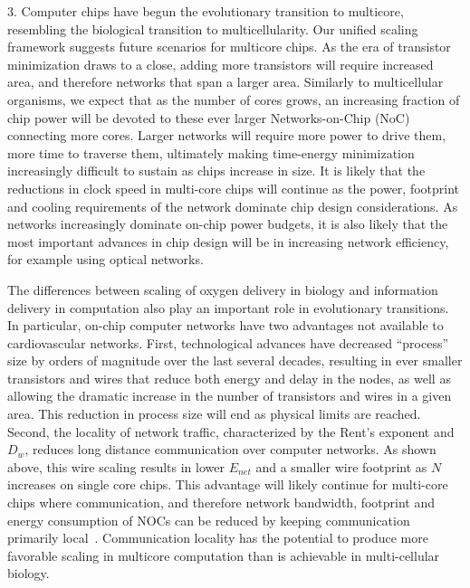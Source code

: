 \documentclass[12pt]{article}
\begin{document}
3. Computer chips have begun the evolutionary transition to multicore, resembling the
biological transition to multicellularity. Our unified scaling framework
suggests future scenarios for multicore chips. As the era of transistor
minimization draws to a close, adding more transistors will require increased
area, and therefore networks that span a larger area. Similarly to
multicellular organisms, we expect that as the number of cores grows, an
increasing fraction of chip power will be devoted to these ever larger 
Networks-on-Chip (NoC) connecting more cores. Larger networks will require more
power to drive them, more time to traverse them, ultimately
making time-energy minimization increasingly difficult to sustain as chips increase in
size. It is likely that the reductions in clock speed
in multi-core chips will continue as the power, footprint and cooling requirements of the network dominate chip design considerations. As networks increasingly dominate on-chip power
budgets, it is also likely that the most important advances in chip design will be in increasing
network efficiency, for example using optical networks. 

  
The differences between scaling of oxygen delivery in biology and information
delivery in computation also play an important role in evolutionary
transitions. In particular, on-chip computer networks have two advantages not
available to cardiovascular networks. First, technological advances have decreased
``process'' size by orders of magnitude over the last several decades,
resulting in ever smaller transistors and wires that reduce both energy and
delay in the nodes, as well as allowing the dramatic increase in the number of
transistors and wires in a given area. This reduction in process size will end
as physical limits are reached. Second, the locality of
network traffic, characterized by the Rent's exponent and $D_w$, reduces long
distance communication over computer networks. As shown above, this wire
scaling results in lower $E_{net}$ and a smaller wire footprint as $N$
increases on single core chips. This advantage will likely continue for
multi-core chips where communication, and therefore network bandwidth,
footprint and energy consumption of NOCs can be reduced by keeping
communication primarily local~\cite{bezerra2010modeling, zarkesh2010hybrid}. Communication locality
has the potential to produce more favorable scaling in multicore
computation than is achievable in multi-cellular biology.

\end{document}
